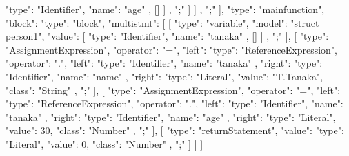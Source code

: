 {{{{                           {
                              "type": "Identifier",
                              "name": "age"
                           },
                           []
                        ]
                     },
                     ";"
                  ]
               ]
            }
         },
         ";"
      ],
      {
         "type": "mainfunction",
         "block": {
            "type": "block",
            "multistmt": [
               [
                  {
                     "type": "variable",
                     "model": "struct person1",
                     "value": [
                        {
                           "type": "Identifier",
                           "name": "tanaka"
                        },
                        []
                     ]
                  },
                  ";"
               ],
               [
                  {
                     "type": "AssignmentExpression",
                     "operator": "=",
                     "left": {
                        "type": "ReferenceExpression",
                        "operator": ".",
                        "left": {
                           "type": "Identifier",
                           "name": "tanaka"
                        },
                        "right": {
                           "type": "Identifier",
                           "name": "name"
                        }
                     },
                     "right": {
                        "type": "Literal",
                        "value": "T.Tanaka",
                        "class": "String"
                     }
                  },
                  ";"
               ],
               [
                  {
                     "type": "AssignmentExpression",
                     "operator": "=",
                     "left": {
                        "type": "ReferenceExpression",
                        "operator": ".",
                        "left": {
                           "type": "Identifier",
                           "name": "tanaka"
                        },
                        "right": {
                           "type": "Identifier",
                           "name": "age"
                        }
                     },
                     "right": {
                        "type": "Literal",
                        "value": 30,
                        "class": "Number"
                     }
                  },
                  ";"
               ],
               [
                  {
                     "type": "returnStatement",
                     "value": {
                        "type": "Literal",
                        "value": 0,
                        "class": "Number"
                     }
                  },
                  ";"
               ]
            ]
         }
      }
   ]
}

